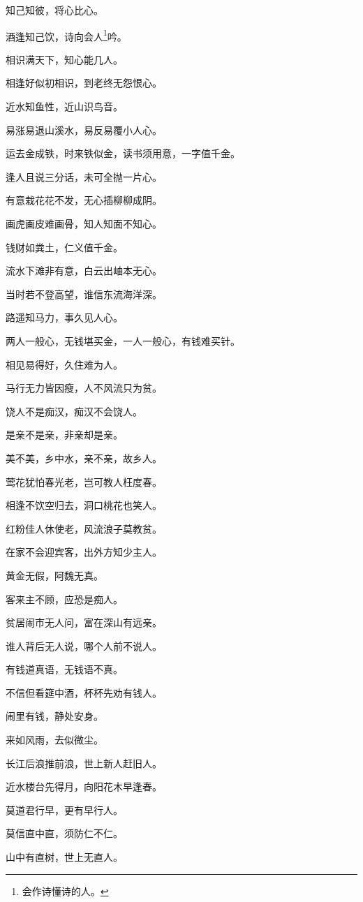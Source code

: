 \documentclass[12pt,oneside]{book}
\begin{document}
知己知彼，将心比心。

酒逢知己饮，诗向会人\footnote{会作诗懂诗的人。}吟。

相识满天下，知心能几人。

相逢好似初相识，到老终无怨恨心。

近水知鱼性，近山识鸟音。

易涨易退山溪水，易反易覆小人心。

运去金成铁，时来铁似金，读书须用意，一字值千金。

逢人且说三分话，未可全抛一片心。

有意栽花花不发，无心插柳柳成阴。

画虎画皮难画骨，知人知面不知心。

钱财如粪土，仁义值千金。

流水下滩非有意，白云出岫本无心。

当时若不登高望，谁信东流海洋深。

路遥知马力，事久见人心。

两人一般心，无钱堪买金，一人一般心，有钱难买针。

相见易得好，久住难为人。

马行无力皆因瘦，人不风流只为贫。

饶人不是痴汉，痴汉不会饶人。

是亲不是亲，非亲却是亲。

美不美，乡中水，亲不亲，故乡人。

莺花犹怕春光老，岂可教人枉度春。

相逢不饮空归去，洞口桃花也笑人。

红粉佳人休使老，风流浪子莫教贫。

在家不会迎宾客，出外方知少主人。

黄金无假，阿魏无真。

客来主不顾，应恐是痴人。

贫居闹市无人问，富在深山有远亲。

谁人背后无人说，哪个人前不说人。

有钱道真语，无钱语不真。

不信但看筵中酒，杯杯先劝有钱人。

闹里有钱，静处安身。

来如风雨，去似微尘。

长江后浪推前浪，世上新人赶旧人。

近水楼台先得月，向阳花木早逢春。

莫道君行早，更有早行人。

莫信直中直，须防仁不仁。

山中有直树，世上无直人。
\end{document}
